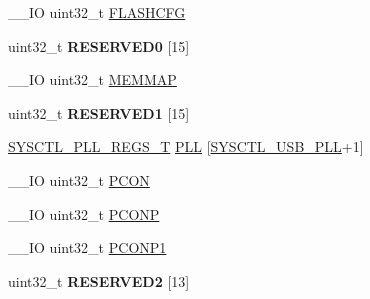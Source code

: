 \begin{DoxyCompactItemize}
\item 
\+\_\+\+\_\+\+I\+O uint32\+\_\+t \hyperlink{struct_l_p_c___s_y_s_c_t_l___t_a8dcbc2e1c89d7bd42dbd19f66e2ddd8e}{F\+L\+A\+S\+H\+C\+F\+G}
\item 
\hypertarget{struct_l_p_c___s_y_s_c_t_l___t_aba8b07e1d5fe15516928f19d739f700e}{uint32\+\_\+t {\bfseries R\+E\+S\+E\+R\+V\+E\+D0} \mbox{[}15\mbox{]}}\label{struct_l_p_c___s_y_s_c_t_l___t_aba8b07e1d5fe15516928f19d739f700e}

\item 
\+\_\+\+\_\+\+I\+O uint32\+\_\+t \hyperlink{struct_l_p_c___s_y_s_c_t_l___t_a5a5d2dc160a256a110878af0c2757a64}{M\+E\+M\+M\+A\+P}
\item 
\hypertarget{struct_l_p_c___s_y_s_c_t_l___t_a794708954b13d73772d88570372b7e31}{uint32\+\_\+t {\bfseries R\+E\+S\+E\+R\+V\+E\+D1} \mbox{[}15\mbox{]}}\label{struct_l_p_c___s_y_s_c_t_l___t_a794708954b13d73772d88570372b7e31}

\item 
\hyperlink{struct_s_y_s_c_t_l___p_l_l___r_e_g_s___t}{S\+Y\+S\+C\+T\+L\+\_\+\+P\+L\+L\+\_\+\+R\+E\+G\+S\+\_\+\+T} \hyperlink{struct_l_p_c___s_y_s_c_t_l___t_aabc2ad04761cf7c1cbfa8a43ddc91c84}{P\+L\+L} \mbox{[}\hyperlink{group___s_y_s_c_t_l__17_x_x__40_x_x_gga5f5478a201b021ed04a0724bff524c4ba5ee38509163556b883664d7259c43dfd}{S\+Y\+S\+C\+T\+L\+\_\+\+U\+S\+B\+\_\+\+P\+L\+L}+1\mbox{]}
\item 
\+\_\+\+\_\+\+I\+O uint32\+\_\+t \hyperlink{struct_l_p_c___s_y_s_c_t_l___t_a92e2ea242fb2d75af44c1979a8cf9ce4}{P\+C\+O\+N}
\item 
\+\_\+\+\_\+\+I\+O uint32\+\_\+t \hyperlink{struct_l_p_c___s_y_s_c_t_l___t_a27650e24e19bd3b8db140db39d9ab1c4}{P\+C\+O\+N\+P}
\item 
\+\_\+\+\_\+\+I\+O uint32\+\_\+t \hyperlink{struct_l_p_c___s_y_s_c_t_l___t_a7e1241849ab9c934991342896ba7c296}{P\+C\+O\+N\+P1}
\item 
\hypertarget{struct_l_p_c___s_y_s_c_t_l___t_a2832f1458683513b2c4c017670c2193c}{uint32\+\_\+t {\bfseries R\+E\+S\+E\+R\+V\+E\+D2} \mbox{[}13\mbox{]}}\label{struct_l_p_c___s_y_s_c_t_l___t_a2832f1458683513b2c4c017670c2193c}


\end{DoxyCompactItemize}
